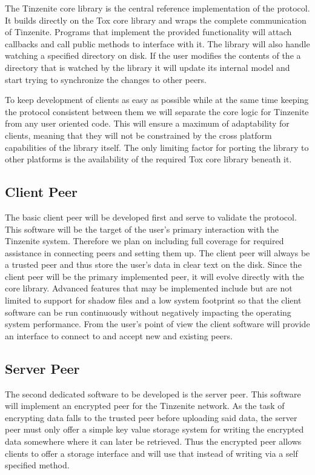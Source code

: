The Tinzenite core library is the central reference implementation of the protocol.
It builds directly on the Tox core library and wraps the complete communication of Tinzenite.
Programs that implement the provided functionality will attach callbacks and call public methods to interface with it.
The library will also handle watching a specified directory on disk.
If the user modifies the contents of the a directory that is watched by the library it will update its internal model and start trying to synchronize the changes to other peers.

To keep development of clients as easy as possible while at the same time keeping the protocol consistent between them we will separate the core logic for Tinzenite from any user oriented code.
This will ensure a maximum of adaptability for clients, meaning that they will not be constrained by the cross platform capabilities of the library itself.
The only limiting factor for porting the library to other platforms is the availability of the required Tox core library beneath it.

\subsection{Client Peer}

The basic client peer will be developed first and serve to validate the protocol.
This software will be the target of the user's primary interaction with the Tinzenite system.
Therefore we plan on including full coverage for required assistance in connecting peers and setting them up.
The client peer will always be a trusted peer and thus store the user's data in clear text on the disk.
Since the client peer will be the primary implemented peer, it will evolve directly with the core library.
Advanced features that may be implemented include but are not limited to support for shadow files and a low system footprint so that the client software can be run continuously without negatively impacting the operating system performance.
From the user's point of view the client software will provide an interface to connect to and accept new and existing peers.

\subsection{Server Peer}

The second dedicated software to be developed is the server peer.
This software will implement an encrypted peer for the Tinzenite network.
As the task of encrypting data falls to the trusted peer before uploading said data, the server peer must only offer a simple key value storage system for writing the encrypted data somewhere where it can later be retrieved.
Thus the encrypted peer allows clients to offer a storage interface and will use that instead of writing via a self specified method.

